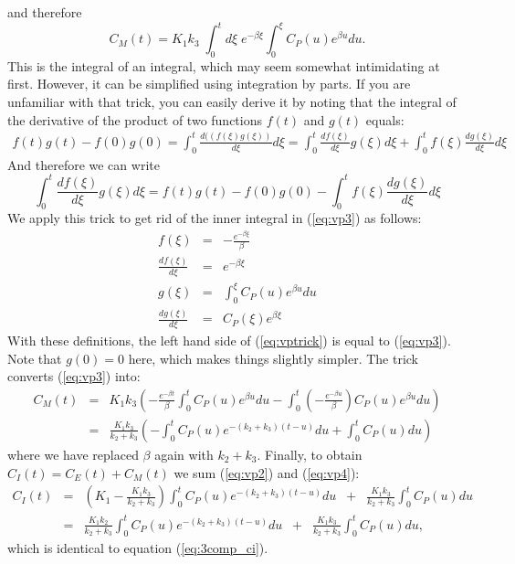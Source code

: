 and therefore
\begin{equation}
  C_M(t) = K_1 k_3 \; \int_0^t d\xi \; e^{-\beta \xi} 
       \int_0^\xi  C_P(u) e^{\beta u} du.   \label{eq:vp3}
\end{equation}
This is the integral of an integral, which may seem somewhat
intimidating at first. However, it can be simplified using integration
by parts. If you are unfamiliar with that trick, you can easily derive
it by noting that the integral of the derivative of the product of two
functions $f(t)$ and $g(t)$ equals:
\begin{eqnarray}
  f(t) g(t) - f(0) g(0) = \int_0^t \frac{d ((f(\xi) g(\xi))}{d\xi} d\xi
 = \int_0^t \frac{d f(\xi)}{d\xi} g(\xi) d\xi 
   +  \int_0^t f(\xi) \frac{d g(\xi)}{d\xi} d\xi
\end{eqnarray}
And therefore we can write
\begin{equation}
  \int_0^t \frac{d f(\xi)}{d\xi} g(\xi) d\xi = f(t) g(t) - f(0) g(0)
        - \int_0^t f(\xi) \frac{d g(\xi)}{d\xi} d\xi \label{eq:vptrick}
\end{equation}
We apply this trick to get rid of the inner integral in (\ref{eq:vp3})
as follows:
\begin{eqnarray}
  f(\xi) &=& -\frac{e^{-\beta \xi}}{\beta}\\
  \frac{d f(\xi)}{d\xi} &=& e^{-\beta\xi}\\
  g(\xi) &=& \int_0^\xi  C_P(u) e^{\beta u} du\\
  \frac{d g(\xi)}{d\xi} &=& C_P(\xi) e^{\beta \xi}
\end{eqnarray}
With these definitions, the left hand side of (\ref{eq:vptrick}) is
equal to (\ref{eq:vp3}). Note that $g(0) = 0$ here, which makes things
slightly simpler.  The trick converts (\ref{eq:vp3}) into:
\begin{eqnarray}
 C_M(t) &=& K_1 k_3 \left( 
  -\frac{e^{-\beta t}}{\beta} \int_0^t  C_P(u) e^{\beta u} du
  - \int_0^t (-\frac{e^{-\beta u}}{\beta}) C_P(u) e^{\beta u} du
   \right) \nonumber \\
 &=& \frac{K_1 k_3}{k_2 + k_3} \left(
   - \int_0^t C_P(u) e^{-(k_2 + k_3) (t -u)} du + \int_0^t C_P(u) du
 \right) \label{eq:vp4}
\end{eqnarray}
where we have replaced $\beta$ again with $k_2 + k_3$.
Finally, to obtain $C_I(t) = C_E(t) + C_M(t)$ we sum (\ref{eq:vp2})
and (\ref{eq:vp4}):
\begin{eqnarray}
C_I(t) &=& (K_1 - \frac{K_1 k_3}{k_2 + k_3}) 
            \int_0^t C_P(u) e^{- (k_2 + k_3) (t -u)} du \;\;
       + \;\; \frac{K_1 k_3}{k_2 + k_3} \int_0^t C_P(u) du \nonumber\\
 &=&
  \frac{K_1 k_2}{k_2 + k_3} \int_0^t C_P(u) e^{- (k_2 + k_3) (t -u)} du
    \;\; + \;\;
   \frac{K_1 k_3}{k_2 + k_3} \int_0^t C_P(u) du,
\end{eqnarray}
which is identical to equation (\ref{eq:3comp_ci}).

